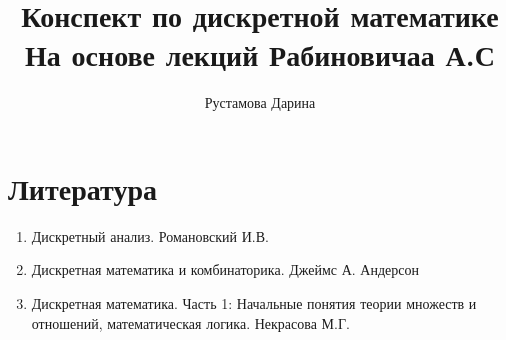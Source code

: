 \documentclass[12pt]{report}
\title{
    Конспект по дискретной математике \\ 
    \large На основе лекций Рабиновичаа А.С}
\author{
    Рустамова Дарина
}
\date{\the\year}
\begin{document}
\maketitle
\tableofcontents

\newcommand\shortlorem{}

\newpage













\chapter*{Литература}   
\begin{enumerate}
    \item Дискретный анализ. Романовский И.В.
    \item Дискретная математика и комбинаторика. Джеймс А. Андерсон
    \item Дискретная математика. Часть 1: Начальные понятия теории множеств и отношений,
    математическая логика. Некрасова М.Г.
\end{enumerate}

\shortlorem
\end{document}
